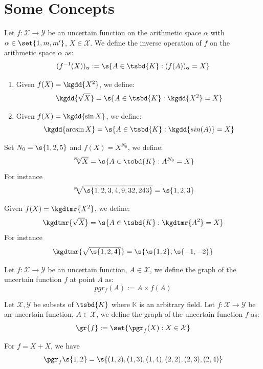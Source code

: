 \section{Some Concepts}
\begin{definition}
	Let $f : \mathcal{X} \to \mathcal{Y}$ be an uncertain function on the arithmetic space $\alpha$ with $\alpha \in \set{1,m,m'}$, $X \in \mathcal{X}$. We define the inverse operation of $f$ on the arithmetic space $\alpha$ as:
	\[
		(f^{-1}(X))_{\alpha} := \s{A \in \tsbd{K}: (f(A))_\alpha = X}
	\]
\end{definition}
\begin{example}
	\begin{enumerate}
		\item Given $f(X)=\kgdd{X^2}$, we define: \[\kgdd{\sqrt{X}} = \s{A \in \tsbd{K} : \kgdd{X^2} = X}\]
		\item Given $f(X)=\kgdd{\sin{X}}$, we define: \[\kgdd{\arcsin{X}} = \s{A \in \tsbd{K} : \kgdd{sin(A)} = X}\]
	\end{enumerate}
\end{example}
\begin{example}
	Set $N_0 = \s{1,2,5}$ and $f(X)=X^{N_0}$, we define: \[\sqrt[N_0]{X} = \s{A \in \tsbd{K} : A^{N_0} = X}\]
For instance \[\sqrt[N_0]{\s{1, 2, 3, 4, 9, 32, 243}} = \s{1,2,3}\]
\end{example}
\begin{example}
	Given $f(X)=\kgdtmr{X^2}$, we define: \[\kgdtmr{\sqrt{X}} = \s{A \in \tsbd{K} : \kgdtmr{A^2} = X}\]
	For instance \[\kgdtmr{\sqrt{\s{1, 2, 4}}} = \s{\s{1,2},\s{-1,-2}}\]
\end{example}
\begin{definition}
	Let $f : \mathcal{X} \to \mathcal{Y}$ be an uncertain function, $A \in \mathcal{X}$, we define the graph of the uncertain function $f$ at point $A$ as:
	\[pgr_f(A):= A \times f(A)\]
\end{definition}
\begin{definition}
	Let $\mathcal{X} ,\mathcal{Y}$ be subsets of $\tsbd{K}$ where $\mathbb{K}$ is an arbitrary field.
	Let $f : \mathcal{X} \to \mathcal{Y}$ be an uncertain function, $A \in \mathcal{X}$, we define the graph of the uncertain function $f$ as:
	\[\gr{f}:= \set{\pgr_f(X) : X \in \mathcal{X}}\]
\end{definition}
\begin{example}
	For $f = X+X$, we have \[\pgr_f{\s{1,2}} = \s{(1,2),(1,3),(1,4),(2,2),(2,3),(2,4)}\]
\end{example}
